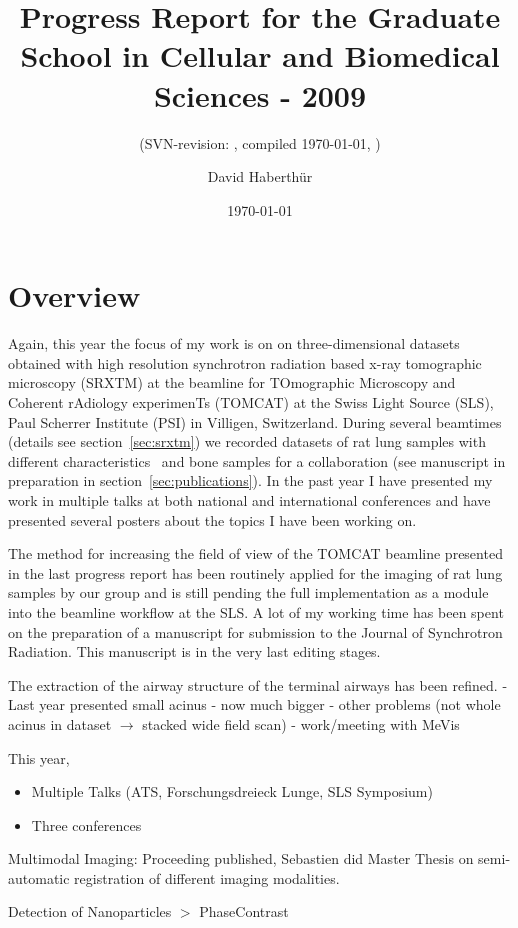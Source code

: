 \documentclass[a4paper,twoside,english,DIV=calc]{scrartcl}
\title{Progress Report for the Graduate School in Cellular and Biomedical Sciences - 2009}
\subtitle{(SVN-revision: \svnkw{LastChangedRevision}, compiled \today, \thistime)}
\author{David Haberthür}
\date{\today}
\begin{document}
\maketitle

\section{Overview}
Again, this year the focus of my work is on on three-dimensional datasets obtained with high resolution synchrotron radiation based x-ray tomographic microscopy (SRXTM) at the beamline for TOmographic Microscopy and Coherent rAdiology experimenTs (TOMCAT) at the Swiss Light Source (SLS), Paul Scherrer Institute (PSI) in Villigen, Switzerland. During several beamtimes (details see section~\ref{sec:srxtm}) we recorded datasets of rat lung samples with different characteristics~ and bone samples for a collaboration (see manuscript in preparation in section~\ref{sec:publications}). In the past year I have presented my work in multiple talks at both national and international conferences and have presented several posters about the topics I have been working on.

The method for increasing the field of view of the TOMCAT beamline presented in the last progress report has been routinely applied for the imaging of rat lung samples by our group and is still pending the full implementation as a module into the beamline workflow at the SLS. A lot of my working time has been spent on the preparation of a manuscript for submission to the Journal of Synchrotron Radiation. This manuscript is in the very last editing stages.

The extraction of the airway structure of the terminal airways has been refined. - Last year presented small acinus - now much bigger - other problems (not whole acinus in dataset $\rightarrow$ stacked wide field scan) - work/meeting with MeVis

This year, 
\begin{itemize}
\item Multiple Talks (ATS, Forschungsdreieck Lunge, SLS Symposium)
\item Three conferences
\end{itemize}

Multimodal Imaging: Proceeding published, Sebastien did Master Thesis on semi-automatic registration of different imaging modalities.

Detection of Nanoparticles $>$ PhaseContrast
\end{document}
